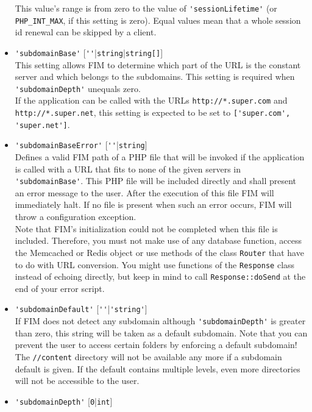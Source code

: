 \documentclass{scrartcl}
\begin{document}
\begin{itemize}
               This value's range is from zero to the value of \lstinline!'sessionLifetime'! (or \lstinline!PHP_INT_MAX!, if this setting is zero). Equal values mean that a whole session id renewal can be skipped by a client.
            \item \lstinline!'subdomainBase'! [\lstinline!''!|\lstinline!string!|\lstinline!string[]!] \\
               This setting allows FIM to determine which part of the URL is the constant server and which belongs to the subdomains. This setting is required when \lstinline!'subdomainDepth'! unequals zero. \\
               If the application can be called with the URLs \texttt{http://*.super.com} and \texttt{http://*.super.net}, this setting is expected to be set to \lstinline!['super.com', 'super.net']!.
            \item \lstinline!'subdomainBaseError'! [\lstinline!''!|\lstinline!string!] \\
               Defines a valid FIM path of a PHP file that will be invoked if the application is called with a URL that fits to none of the given servers in \lstinline!'subdomainBase'!. This PHP file will be included directly and shall present an error message to the user. After the execution of this file FIM will immediately halt. If no file is present when such an error occurs, FIM will throw a configuration exception. \\
               Note that FIM's initialization could not be completed when this file is included. Therefore, you must not make use of any database function, access the Memcached or Redis object or use methods of the class \lstinline!Router! that have to do with URL conversion. You might use functions of the \lstinline!Response! class instead of echoing directly, but keep in mind to call \lstinline!Response::doSend! at the end of your error script.
            \item \lstinline!'subdomainDefault'! [\lstinline!''!|\lstinline!'string'!] \\
               If FIM does not detect any subdomain although \lstinline!'subdomainDepth'! is greater than zero, this string will be taken as a default subdomain. Note that you can prevent the user to access certain folders by enforcing a default subdomain! The \texttt{//content} directory will not be available any more if a subdomain default is given. If the default contains multiple levels, even more directories will not be accessible to the user.
            \item \lstinline!'subdomainDepth'! [\lstinline!0!|\lstinline!int!] \\

\end{itemize}
\end{document}
